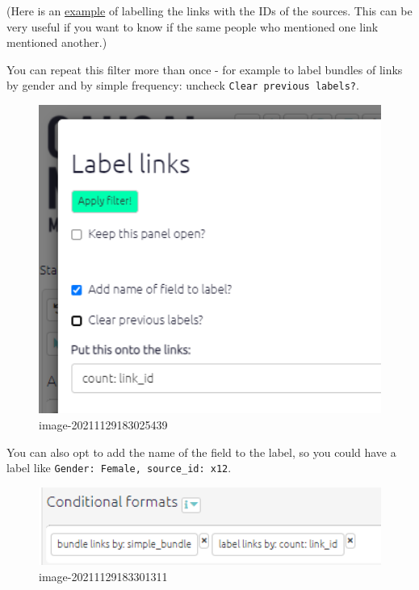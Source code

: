 \documentclass[
]{book}
\begin{document}
(Here is an \href{causalmap.shinyapps.io/CausalMap2/?s=165}{example} of labelling the links with the IDs of the sources. This can be very useful if you want to know if the same people who mentioned one link mentioned another.)

You can repeat this filter more than once - for example to label bundles of links by gender and by simple frequency: uncheck \texttt{Clear\ previous\ labels?}.

\begin{figure}
\centering
\includegraphics[width=6.77083in,height=\textheight]{_assets/image-20211129183025439.png}
\caption{image-20211129183025439}
\end{figure}

You can also opt to add the name of the field to the label, so you could have a label like \texttt{Gender:\ Female,\ source\_id:\ x12}.

\begin{figure}
\centering
\includegraphics[width=6.77083in,height=\textheight]{_assets/image-20211129183301311.png}
\caption{image-20211129183301311}
\end{figure}
\end{document}
